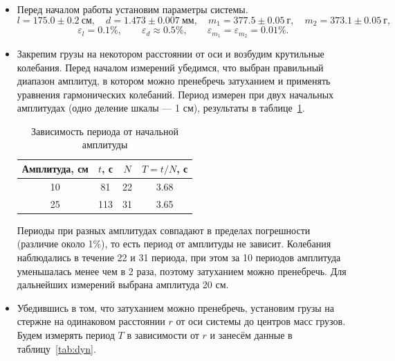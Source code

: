 \documentclass[12pt,a4paper]{article}
\begin{document}
\begin{itemize}
    \item Перед началом работы установим параметры системы.
    \[
        l = 175.0 \pm 0.2~\text{см}, \quad d = 1.473 \pm 0.007~\text{мм}, \quad m_1 = 377.5 \pm 0.05~\text{г}, \quad m_2 = 373.1 \pm 0.05~\text{г},
    \]
    \[
        \varepsilon_l = 0.1\%, \qquad \varepsilon_d \approx 0.5\%, \qquad \varepsilon_{m_1} = \varepsilon_{m_2} = 0.01\%.
    \]


    \item Закрепим грузы на некотором расстоянии от оси и возбудим крутильные колебания. Перед началом измерений убедимся, что выбран правильный диапазон
    амплитуд, в котором можно пренебречь затуханием и применять уравнения гармонических колебаний. Период измерен при двух начальных амплитудах
    (одно деление шкалы --- 1 см), результаты в таблице~\ref{tab:amp}.

    \begin{table}[H]
        \centering
        \caption{Зависимость периода от начальной амплитуды}
        \label{tab:amp}
        \begin{tabular}{|c|c|c|c|}
            \hline
            Амплитуда, см & $t$, с & $N$ & $T = t/N$, с \\
            \hline
            10 & 81 & 22 & 3.68 \\
            \hline
            25 & 113 & 31 & 3.65 \\
            \hline
        \end{tabular}
    \end{table}

    Периоды при разных амплитудах совпадают в пределах погрешности (различие около 1\%), то есть период от амплитуды не зависит.
    Колебания наблюдались в течение 22 и 31 периода, при этом за 10 периодов амплитуда уменьшалась менее чем в 2 раза, поэтому затуханием можно пренебречь.
    Для дальнейших измерений выбрана амплитуда 20 см.

    \item Убедившись в том, что затуханием можно пренебречь, установим грузы на стержне на одинаковом расстоянии $r$ от оси системы до центров масс грузов.
    Будем измерять период $T$ в зависимости от $r$ и занесём данные в таблицу~\ref{tab:dyn}.


\end{itemize}
\end{document}
